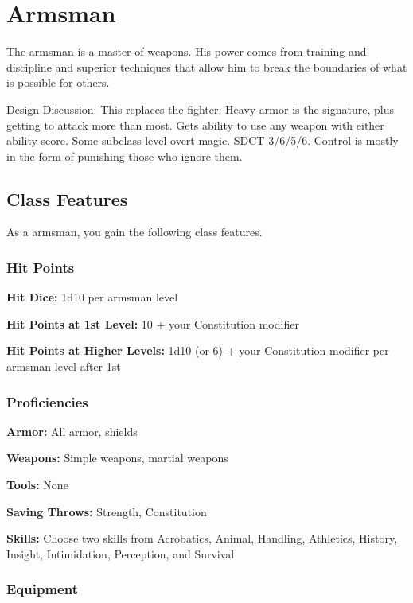 \section{Armsman\label{class:armsman}}

The armsman is a master of weapons. His power comes from training and discipline and superior techniques that allow him to break the boundaries of what is possible for others.

Design Discussion: This replaces the fighter. Heavy armor is the signature, plus getting to attack more than most. Gets ability to use any weapon with either ability score. Some subclass-level overt magic. SDCT 3/6/5/6. Control is mostly in the form of punishing those who ignore them.

\subsection{Class Features}

As a armsman, you gain the following class features.

\subsubsection{Hit Points}

\textbf{Hit Dice:} 1d10 per armsman level

\textbf{Hit Points at 1st Level:} 10 + your Constitution modifier

\textbf{Hit Points at Higher Levels:} 1d10 (or 6) + your Constitution modifier per armsman level after 1st

\subsubsection{Proficiencies}

\textbf{Armor:} All armor, shields

\textbf{Weapons:} Simple weapons, martial weapons

\textbf{Tools:} None

\textbf{Saving Throws:} Strength, Constitution

\textbf{Skills:} Choose two skills from Acrobatics, Animal, Handling, Athletics, History, Insight, Intimidation, Perception, and Survival

\subsubsection{Equipment}

